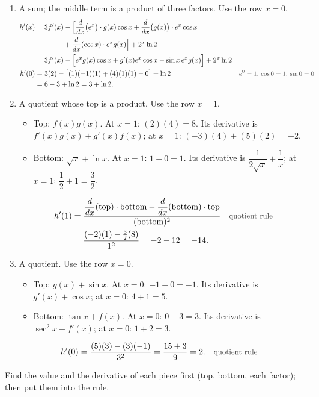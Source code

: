 \documentclass[11pt,a4paper]{article}
\newcounter{example}
\newcommand{\why}[1]{\text{\small\color{darkgray}#1}}
\begin{document}
\begin{examplesolution}
\relax
\begin{enumerate}[label=(\alph*)]
 \item A sum; the middle term is a product of three factors. Use the row $x=0$.
 \begin{align*}
 h'(x)&=3f'(x)-\Bigl[\frac{d}{dx}\bigl(e^x\bigr)\cdot g(x)\cos x+\frac{d}{dx}\bigl(g(x)\bigr)\cdot e^x\cos x\\
 &\qquad\qquad+\frac{d}{dx}(\cos x)\cdot e^xg(x)\Bigr]+2^x\ln2\\
 &=3f'(x)-\Bigl[e^xg(x)\cos x+g'(x)e^x\cos x-\sin x\,e^xg(x)\Bigr]+2^x\ln2\\
 h'(0)&=3(2)-\bigl[(1)(-1)(1)+(4)(1)(1)-0\bigr]+\ln2 &&\why{$e^0=1$, $\cos0=1$, $\sin0=0$}\\
 &=6-3+\ln2=3+\ln2.
 \end{align*}
 \item A quotient whose top is a product. Use the row $x=1$.
 \begin{itemize}
  \item Top: $f(x)g(x)$. At $x=1$: $(2)(4)=8$. Its derivative is $f'(x)g(x)+g'(x)f(x)$; at $x=1$: $(-3)(4)+(5)(2)=-2$.
  \item Bottom: $\sqrt x+\ln x$. At $x=1$: $1+0=1$. Its derivative is $\dfrac{1}{2\sqrt x}+\dfrac1x$; at $x=1$: $\dfrac12+1=\dfrac32$.
 \end{itemize}
 \begin{align*}
 h'(1)&=\frac{\dfrac{d}{dx}(\text{top})\cdot\text{bottom}-\dfrac{d}{dx}(\text{bottom})\cdot\text{top}}{(\text{bottom})^2} &&\why{quotient rule}\\
 &=\frac{(-2)(1)-\frac32(8)}{1^2}=-2-12=-14.
 \end{align*}
 \item A quotient. Use the row $x=0$.
 \begin{itemize}
  \item Top: $g(x)+\sin x$. At $x=0$: $-1+0=-1$. Its derivative is $g'(x)+\cos x$; at $x=0$: $4+1=5$.
  \item Bottom: $\tan x+f(x)$. At $x=0$: $0+3=3$. Its derivative is $\sec^2x+f'(x)$; at $x=0$: $1+2=3$.
 \end{itemize}
 \begin{align*}
 h'(0)&=\frac{(5)(3)-(3)(-1)}{3^2}=\frac{15+3}{9}=2. &&\why{quotient rule}
 \end{align*}
\end{enumerate}
\begin{takeaway}
Find the value and the derivative of each piece first (top, bottom, each factor); then put them into the rule.
\end{takeaway}
\end{examplesolution}
\end{document}
